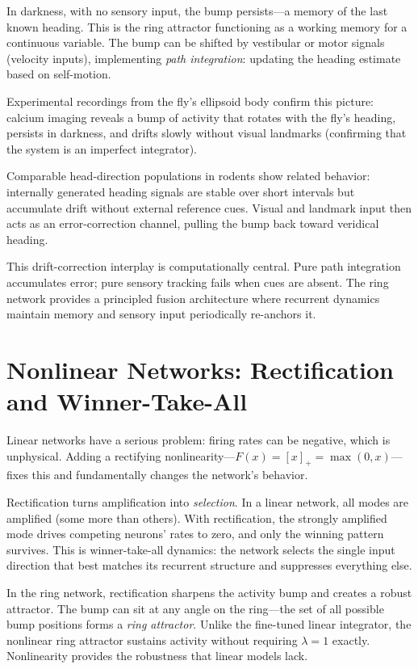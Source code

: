In darkness, with no sensory input, the bump persists---a memory of the last known heading. This is the ring attractor functioning as a working memory for a continuous variable. The bump can be shifted by vestibular or motor signals (velocity inputs), implementing \emph{path integration}: updating the heading estimate based on self-motion.

Experimental recordings from the fly's ellipsoid body confirm this picture: calcium imaging reveals a bump of activity that rotates with the fly's heading, persists in darkness, and drifts slowly without visual landmarks (confirming that the system is an imperfect integrator).

Comparable head-direction populations in rodents show related behavior: internally generated heading signals are stable over short intervals but accumulate drift without external reference cues. Visual and landmark input then acts as an error-correction channel, pulling the bump back toward veridical heading.

This drift-correction interplay is computationally central. Pure path integration accumulates error; pure sensory tracking fails when cues are absent. The ring network provides a principled fusion architecture where recurrent dynamics maintain memory and sensory input periodically re-anchors it.

\section{Nonlinear Networks: Rectification and Winner-Take-All}
\label{sec:nonlinear-networks}

Linear networks have a serious problem: firing rates can be negative, which is unphysical. Adding a rectifying nonlinearity---$F(x) = [x]_+ = \max(0, x)$---fixes this and fundamentally changes the network's behavior.

Rectification turns amplification into \emph{selection}. In a linear network, all modes are amplified (some more than others). With rectification, the strongly amplified mode drives competing neurons' rates to zero, and only the winning pattern survives. This is winner-take-all dynamics: the network selects the single input direction that best matches its recurrent structure and suppresses everything else.

In the ring network, rectification sharpens the activity bump and creates a robust attractor. The bump can sit at any angle on the ring---the set of all possible bump positions forms a \emph{ring attractor}. Unlike the fine-tuned linear integrator, the nonlinear ring attractor sustains activity without requiring $\lambda = 1$ exactly. Nonlinearity provides the robustness that linear models lack.

